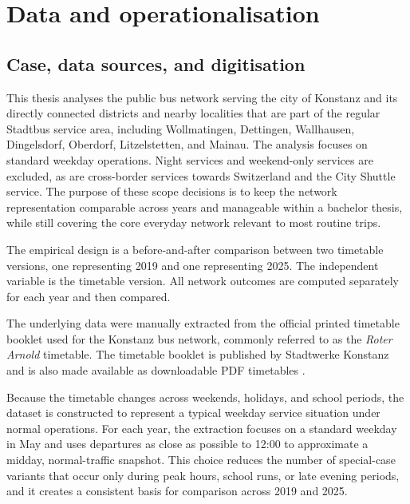 \documentclass[12pt,a4paper,oneside]{report}
\begin{document}
\chapter{Data and operationalisation}\label{ch:data}

\section{Case, data sources, and digitisation}\label{sec:case}

This thesis analyses the public bus network serving the city of Konstanz and its directly connected districts and nearby localities that are part of the regular Stadtbus service area, including Wollmatingen, Dettingen, Wallhausen, Dingelsdorf, Oberdorf, Litzelstetten, and Mainau.
The analysis focuses on standard weekday operations.
Night services and weekend-only services are excluded, as are cross-border services towards Switzerland and the City Shuttle service.
The purpose of these scope decisions is to keep the network representation comparable across years and manageable within a bachelor thesis, while still covering the core everyday network relevant to most routine trips.

The empirical design is a before-and-after comparison between two timetable versions, one representing 2019 and one representing 2025.
The independent variable is the timetable version.
All network outcomes are computed separately for each year and then compared.

The underlying data were manually extracted from the official printed timetable booklet used for the Konstanz bus network, commonly referred to as the \emph{Roter Arnold} timetable.
The timetable booklet is published by Stadtwerke Konstanz and is also made available as downloadable PDF timetables \citep{stadtwerke2019,stadtwerke2025}.

Because the timetable changes across weekends, holidays, and school periods, the dataset is constructed to represent a typical weekday service situation under normal operations.
For each year, the extraction focuses on a standard weekday in May and uses departures as close as possible to 12:00 to approximate a midday, normal-traffic snapshot.
This choice reduces the number of special-case variants that occur only during peak hours, school runs, or late evening periods, and it creates a consistent basis for comparison across 2019 and 2025.
\end{document}
